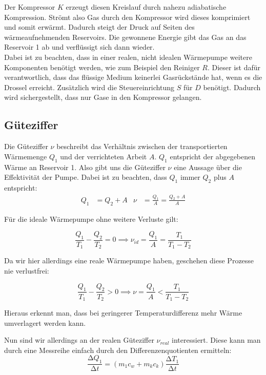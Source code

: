 Der Kompressor $K$ erzeugt diesen Kreislauf durch nahezu adiabatische Kompression. Strömt also Gas durch den 
Kompressor wird dieses komprimiert und somit erwärmt.
Dadurch steigt der Druck auf Seiten des wärmeaufnehmenden Reservoirs.
Die gewonnene Energie gibt das Gas an das Reservoir 1 ab und verflüssigt sich dann wieder.\\

Dabei ist zu beachten, dass in einer realen, nicht idealen Wärmepumpe weitere Komponenten benötigt werden, wie zum Beispiel den Reiniger $R$.
Dieser ist dafür verantwortlich, dass das flüssige Medium keinerlei Gasrückstände hat, wenn es die Drossel erreicht.
Zusätzlich wird die Steuereinrichtung $S$ für $D$ benötigt. Dadurch wird sichergestellt, dass nur Gase in den Kompressor gelangen.

\subsection{Güteziffer} \label{sec:Güteziffer}

Die Güteziffer $\nu$ beschreibt das Verhältnis zwischen der transportierten Wärmemenge $Q_{1}$ und der verrichteten Arbeit $A$.
$Q_{1}$ entspricht der abgegebenen Wärme an Reservoir 1. Also gibt uns die Güteziffer $\nu$ eine Aussage über die Effektivität der Pumpe.
Dabei ist zu beachten, dass $Q_{1}$ immer $Q_{2}$ plus $A$ entspricht:
\begin{align} \label{eq:Güteziffer}
    Q_{1} &= Q_{2} + A & \nu &= \frac{Q_{1}}{A} = \frac{Q_{2} + A}{A}
\end{align}

Für die ideale Wärmepumpe ohne weitere Verluste gilt:

\begin{equation} \label{eq:nu_id}
    \frac{Q_{1}}{T_{1}} - \frac{Q_{2}}{T_{2}} = 0 \implies \nu_{id} = \frac{Q_{1}}{A} = \frac{T_{1}}{T_{1} - T_{2}}
\end{equation}

Da wir hier allerdings eine reale Wärmepumpe haben, geschehen diese Prozesse nie verlustfrei:

\begin{equation}
    \frac{Q_{1}}{T_{1}} - \frac{Q_{2}}{T_{2}} > 0 \implies \nu = \frac{Q_{1}}{A} < \frac{T_{1}}{T_{1} - T_{2}}
\end{equation}

Hieraus erkennt man, dass bei geringerer Temperaturdifferenz mehr Wärme umverlagert werden kann.

Nun sind wir allerdings an der realen Güteziffer $\nu_{real}$ interessiert.
Diese kann man durch eine Messreihe einfach durch den Differenzenquotienten ermitteln:
\begin{equation} \label{eq:Q1diff}
    \frac{\increment Q_{1}}{\increment t} = (m_{1} c_{w} + m_{k} c_{k}) \frac{\increment T_{1}}{\increment t}
\end{equation}

